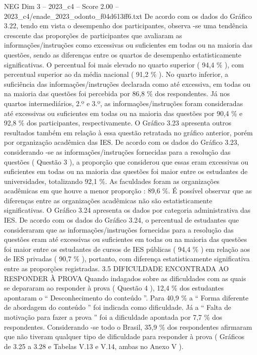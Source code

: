 \begin{textsample}{NEG Dim 3 – 2023\_c4 – Score 2.00 – 2023\_c4/enade\_2023\_odonto\_f04d613ff6.txt}
De acordo com os dados do Gráfico 3.22, tendo em vista o desempenho dos participantes, observa -se uma tendência crescente das proporções de participantes que avaliaram as informações/instruções como excessivas ou suficientes em todas ou na maioria das questões, sendo as diferenças entre os quartos de desempenho estatisticamente significativas.
O percentual foi mais elevado no quarto superior ( 94,4 \% ), com percentual superior ao da média nacional ( 91,2 \% ).
No quarto inferior, a suficiência das informações/instruções declarada como até excessiva, em todas ou na maioria das questões foi percebida por 86,8 \% dos respondentes.
Já nos quartos intermediários, 2.º e 3.º, as informações/instruções foram consideradas até excessivas ou suficientes em todas ou na maioria das questões por 90,4 \% e 92,8 \% dos participantes, respectivamente.
O Gráfico 3.23 apresenta outros resultados também em relação à essa questão retratada no gráfico anterior, porém por organização acadêmica das IES.
De acordo com os dados do Gráfico 3.23, considerando -se as informações/instruções fornecidas para a resolução das questões ( Questão 3 ), a proporção que considerou que essas eram excessivas ou suficientes em todas ou na maioria das questões foi maior entre os estudantes de universidades, totalizando 92,1 \%.
As faculdades foram as organizações acadêmicas em que houve a menor proporção : 89,6 \%.
É possível observar que as diferenças entre as organizações acadêmicas não são estatisticamente significativas.
O Gráfico 3.24 apresenta os dados por categoria administrativa das IES.
De acordo com os dados do Gráfico 3.24, o percentual de estudantes que consideraram que as informações/instruções fornecidas para a resolução das questões eram até excessivas ou suficientes em todas ou na maioria das questões foi maior entre os estudantes de cursos de IES públicas ( 94,4 \% ) em relação aos de IES privadas ( 90,7 \% ), portanto, com diferença estatisticamente significativa entre as proporções registradas. 3.5 DIFICULDADE ENCONTRADA AO RESPONDER À PROVA Quando indagados sobre as dificuldades com as quais se depararam ao responder à prova ( Questão 4 ), 12,4 \% dos estudantes apontaram o “ Desconhecimento do conteúdo ”.
Para 40,9 \% a “ Forma diferente de abordagem do conteúdo ” foi indicada como dificuldade.
Já a “ Falta de motivação para fazer a prova ” foi a dificuldade apontada por 7,7 \% dos respondentes.
Considerando -se todo o Brasil, 35,9 \% dos respondentes afirmaram que não tiveram qualquer tipo de dificuldade para responder à prova ( Gráficos de 3.25 a 3.28 e Tabelas V.13 e V.14, ambas no Anexo V ).

\end{textsample}
